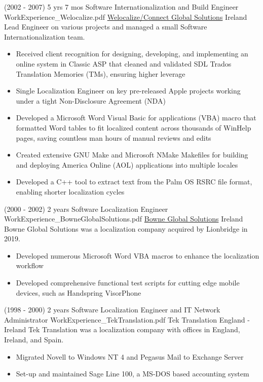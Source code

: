 \begin{twenty}
\twentyitem
  {(2002 - 2007) 5 yrs 7 mos}
  {Software Internationalization and Build Engineer}
  {WorkExperience_Welocalize.pdf}
  {\href{https://www.welocalize.com/}{Welocalize/Connect Global Solutions}}
  {Ireland}
  {Lead Engineer on various projects and managed a small Software Internationalization team.}
  {}
  {\begin{itemize}
    \item Received client recognition for designing, developing, and implementing an online system in Classic ASP that cleaned and validated SDL Trados Translation Memories (TMs), ensuring higher leverage
    \item Single Localization Engineer on key pre-released Apple projects working under a tight Non-Disclosure Agreement (NDA)
    \item Developed a Microsoft Word Visual Basic for applications (VBA) macro that formatted Word tables to fit localized content across thousands of WinHelp pages, saving countless man hours of manual reviews and edits
    \item Created extensive GNU Make and Microsoft NMake Makefiles for building and deploying America Online (AOL) applications into multiple locales
    \item Developed a C++ tool to extract text from the Palm OS RSRC file format, enabling shorter localization cycles
  \end{itemize}
  }
\end{twenty}

\begin{twenty}
\twentyitem
  {(2000 - 2002) 2 years}
  {Software Localization Engineer}
  {WorkExperience_BowneGlobalSolutions.pdf}
  {\href{https://www.lionbridge.com/}{Bowne Global Solutions}}
  {Ireland}
  {Bowne Global Solutions was a localization company acquired by Lionbridge in 2019.}
  {}
  {\begin{itemize}
    \item Developed numerous Microsoft Word VBA macros to enhance the localization workflow
    \item Developed comprehensive functional test scripts for cutting edge mobile devices, such as Handspring VisorPhone
  \end{itemize}
  }
\end{twenty}

\begin{twenty}
\twentyitem
  {(1998 - 2000) 2 years}
  {Software Localization Engineer and IT Network Administrator}
  {WorkExperience_TekTranslation.pdf}
  {Tek Translation}
  {England - Ireland}
  {Tek Translation was a localization company with offices in England, Ireland, and Spain.}
  {}
  {\begin{itemize}
    \item Migrated Novell to Windows NT 4 and Pegasus Mail to Exchange Server
    \item Set-up and maintained Sage Line 100, a MS-DOS based accounting system
  \end{itemize}
  }
\end{twenty}
